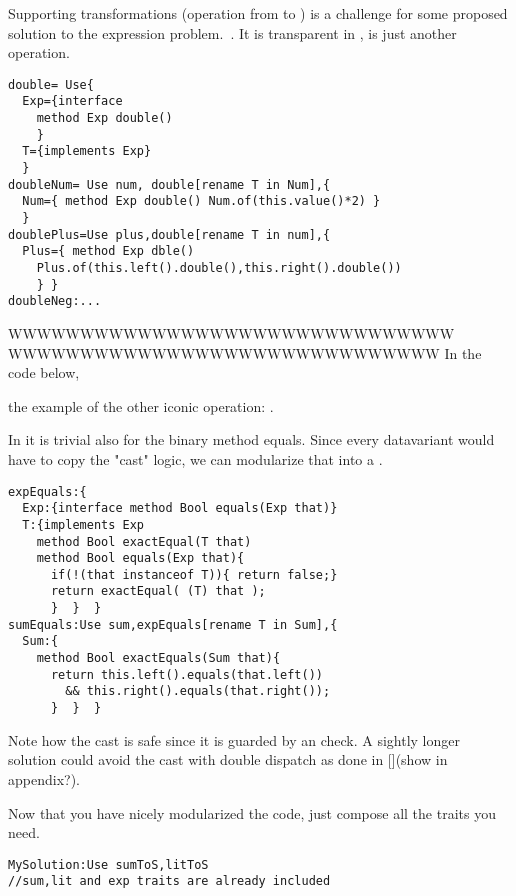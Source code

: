 Supporting transformations (operation from \Q@Exp@ to \Q@Exp@)
is a challenge for some proposed solution to the expression problem.~\cite{}.
It is transparent in \name, is just another operation.
\begin{lstlisting}
double= Use{
  Exp={interface
    method Exp double()
    }
  T={implements Exp}
  }
doubleNum= Use num, double[rename T in Num],{
  Num={ method Exp double() Num.of(this.value()*2) }
  }
doublePlus=Use plus,double[rename T in num],{
  Plus={ method Exp dble()
    Plus.of(this.left().double(),this.right().double()) 
    } }
doubleNeg:...
\end{lstlisting}
WWWWWWWWWWWWWWWWWWWWWWWWWWWWWWW
WWWWWWWWWWWWWWWWWWWWWWWWWWWWWW
In the code below,

 the example of the other iconic operation: \Q@eval@.



In \name it is trivial also for the binary method equals.
Since every datavariant would have to copy the "cast" logic,
 we can modularize that into a \Q@expEquals@.

\begin{lstlisting}
expEquals:{
  Exp:{interface method Bool equals(Exp that)}
  T:{implements Exp
    method Bool exactEqual(T that)
    method Bool equals(Exp that){
      if(!(that instanceof T)){ return false;}
      return exactEqual( (T) that );
      }  }  }
sumEquals:Use sum,expEquals[rename T in Sum],{
  Sum:{
    method Bool exactEquals(Sum that){
      return this.left().equals(that.left()) 
        && this.right().equals(that.right());
      }  }  }
\end{lstlisting}
Note how the cast is safe since it is guarded by
an \Q@instanceof@ check. A sightly longer solution could avoid the
cast with double dispatch as done in [](show in appendix?).

Now that you have nicely modularized the code, just compose all the traits you need.
\begin{lstlisting}
MySolution:Use sumToS,litToS
//sum,lit and exp traits are already included
\end{lstlisting}

